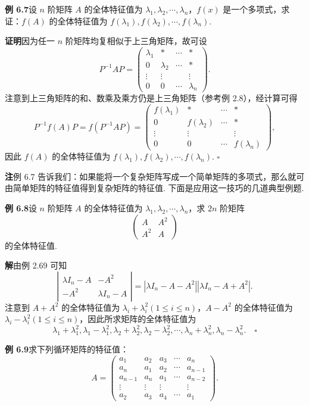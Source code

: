 \documentclass[UTF8, 12pt, fontset=fandol, oneside]{ctexart}
\begin{document}
\noindent\textbf{例 6.7}\quad 设 $n$ 阶矩阵 $A$ 的全体特征值为 $\lambda_1,\lambda_2,\cdots,\lambda_n$，$f(x)$ 是一个多项式，求证：$f(A)$ 的全体特征值为 $f(\lambda_1),f(\lambda_2),\cdots,f(\lambda_n)$.

\noindent\textbf{证明}\quad 因为任一 $n$ 阶矩阵均复相似于上三角矩阵，故可设
\[
P^{-1}AP=\left(\begin{array}{cccc}
\lambda_1 & * & \cdots & *\\
0 & \lambda_2 & \cdots & *\\
\vdots & \vdots & & \vdots\\
0 & 0 & \cdots & \lambda_n
\end{array}\right).
\]
注意到上三角矩阵的和、数乘及乘方仍是上三角矩阵（参考例 2.8），经计算可得
\[
P^{-1}f(A)P=f(P^{-1}AP)=\left(\begin{array}{cccc}
f(\lambda_1) & * & \cdots & *\\
0 & f(\lambda_2) & \cdots & *\\
\vdots & \vdots & & \vdots\\
0 & 0 & \cdots & f(\lambda_n)
\end{array}\right),
\]
因此 $f(A)$ 的全体特征值为 $f(\lambda_1),f(\lambda_2),\cdots,f(\lambda_n)$. $\square$

\noindent\textbf{注}\quad 例 6.7 告诉我们：如果能将一个复杂矩阵写成一个简单矩阵的多项式，那么就可由简单矩阵的特征值得到复杂矩阵的特征值. 下面是应用这一技巧的几道典型例题.

\noindent\textbf{例 6.8}\quad 设 $n$ 阶矩阵 $A$ 的全体特征值为 $\lambda_1,\lambda_2,\cdots,\lambda_n$，求 $2n$ 阶矩阵
\[
\left(\begin{array}{cc}
A & A^2\\
A^2 & A
\end{array}\right)
\]
的全体特征值.

\noindent\textbf{解}\quad 由例 2.69 可知
\[
\left|\begin{array}{cc}
\lambda I_n-A & -A^2\\
-A^2 & \lambda I_n-A
\end{array}\right|
=|\lambda I_n-A-A^2||\lambda I_n-A+A^2|.
\]
注意到 $A+A^2$ 的全体特征值为 $\lambda_i+\lambda_i^2(1\le i\le n)$，$A-A^2$ 的全体特征值为 $\lambda_i-\lambda_i^2(1\le i\le n)$，因此所求矩阵的全体特征值为
\[
\lambda_1+\lambda_1^2,\lambda_1-\lambda_1^2,\lambda_2+\lambda_2^2,\lambda_2-\lambda_2^2,\cdots,\lambda_n+\lambda_n^2,\lambda_n-\lambda_n^2. \quad \square
\]

\noindent\textbf{例 6.9}\quad 求下列循环矩阵的特征值：
\[
A=\left(\begin{array}{ccccc}
a_1 & a_2 & a_3 & \cdots & a_n\\
a_n & a_1 & a_2 & \cdots & a_{n-1}\\
a_{n-1} & a_n & a_1 & \cdots & a_{n-2}\\
\vdots & \vdots & \vdots & & \vdots\\
a_2 & a_3 & a_4 & \cdots & a_1
\end{array}\right).
\]
\end{document}

